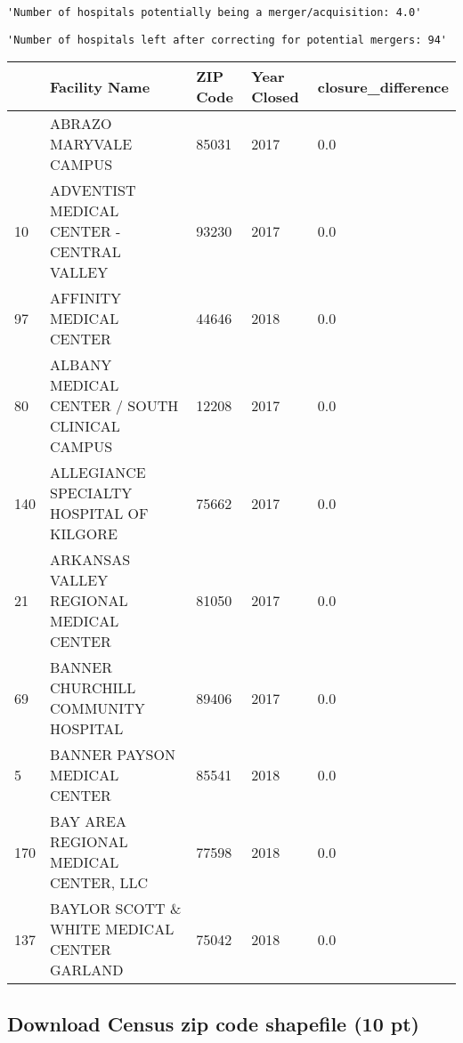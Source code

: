 \documentclass[
  letterpaper,
  DIV=11,
  numbers=noendperiod]{scrartcl}
\begin{document}
\begin{verbatim}
'Number of hospitals potentially being a merger/acquisition: 4.0'
\end{verbatim}

\begin{verbatim}
'Number of hospitals left after correcting for potential mergers: 94'
\end{verbatim}

\begin{longtable}[]{@{}lllll@{}}
\toprule\noalign{}
& Facility Name & ZIP Code & Year Closed & closure\_difference \\
\midrule\noalign{}
\endhead
\bottomrule\noalign{}
\endlastfoot
4 & ABRAZO MARYVALE CAMPUS & 85031 & 2017 & 0.0 \\
10 & ADVENTIST MEDICAL CENTER - CENTRAL VALLEY & 93230 & 2017 & 0.0 \\
97 & AFFINITY MEDICAL CENTER & 44646 & 2018 & 0.0 \\
80 & ALBANY MEDICAL CENTER / SOUTH CLINICAL CAMPUS & 12208 & 2017 &
0.0 \\
140 & ALLEGIANCE SPECIALTY HOSPITAL OF KILGORE & 75662 & 2017 & 0.0 \\
21 & ARKANSAS VALLEY REGIONAL MEDICAL CENTER & 81050 & 2017 & 0.0 \\
69 & BANNER CHURCHILL COMMUNITY HOSPITAL & 89406 & 2017 & 0.0 \\
5 & BANNER PAYSON MEDICAL CENTER & 85541 & 2018 & 0.0 \\
170 & BAY AREA REGIONAL MEDICAL CENTER, LLC & 77598 & 2018 & 0.0 \\
137 & BAYLOR SCOTT \& WHITE MEDICAL CENTER GARLAND & 75042 & 2018 &
0.0 \\
\end{longtable}

\subsection{Download Census zip code shapefile (10
pt)}\label{download-census-zip-code-shapefile-10-pt}
\end{document}

